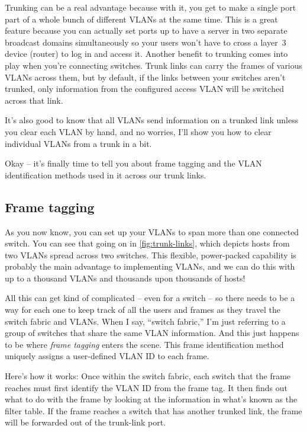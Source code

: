 Trunking can be a real advantage because with it, you get to make a
single port part of a whole bunch of different VLANs at the same time.
This is a great feature because you can actually set ports up to have a
server in two separate broadcast domains simultaneously so your users
won't have to cross a layer~3 device (router) to log in and access it.
Another benefit to trunking comes into play when you're connecting
switches. Trunk links can carry the frames of various VLANs across them,
but by default, if the links between your switches aren't trunked, only
information from the configured access VLAN will be switched across that
link.

It's also good to know that all VLANs send information on a trunked link
unless you clear each VLAN by hand, and no worries, I'll show you how to
clear individual VLANs from a trunk in a bit.

Okay -- it's finally time to tell you about frame tagging and the VLAN identification methods used in it across our trunk links.

\subsection{Frame tagging}

As you now know, you can set up your VLANs to span more than one connected switch.
You can see that going on in \cref{fig:trunk-links}, which depicts hosts from two VLANs spread across two switches.
This flexible, power-packed capability is probably the main advantage to implementing VLANs, and we can do this with up to a thousand VLANs and thousands upon thousands of hosts!

All this can get kind of complicated -- even for a switch -- so there needs to be a way for each one to keep track of all the users and frames as they travel the switch fabric and VLANs.
When I say, ``switch fabric,'' I'm just referring to a group of switches that share the same VLAN information.
And this just happens to be where \emph{frame tagging} enters the scene.
This frame identification method uniquely assigns a user-defined VLAN ID to each frame.

Here's how it works: Once within the switch fabric, each switch that the
frame reaches must first identify the VLAN ID from the frame tag. It
then finds out what to do with the frame by looking at the information
in what's known as the filter table. If the frame reaches a switch that
has another trunked link, the frame will be forwarded out of the
trunk-link port.

